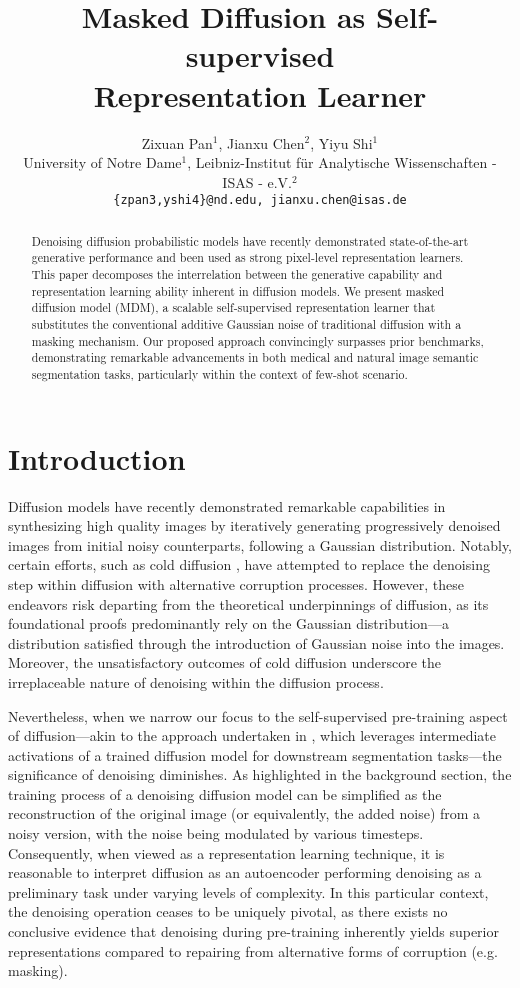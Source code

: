 \documentclass{article} \usepackage{iclr2024_conference,times}
\title{Masked Diffusion as Self-supervised \\ Representation Learner}
\author{Zixuan Pan$^1$, Jianxu Chen$^2$, Yiyu Shi$^1$\\
University of Notre Dame$^1$, Leibniz-Institut für Analytische Wissenschaften - ISAS - e.V.$^2$\\
\texttt{\{zpan3,yshi4\}@nd.edu, jianxu.chen@isas.de} \\
}
\begin{document}
\maketitle

\begin{abstract}
Denoising diffusion probabilistic models have recently demonstrated state-of-the-art generative performance and been used as strong pixel-level representation learners. This paper decomposes the interrelation between the generative capability and representation learning ability inherent in diffusion models. We present masked diffusion model (MDM), a scalable self-supervised representation learner that substitutes the conventional additive Gaussian noise of traditional diffusion with a masking mechanism. Our proposed approach convincingly surpasses prior benchmarks, demonstrating remarkable advancements in both medical and natural image semantic segmentation tasks, particularly within the context of few-shot scenario.
\end{abstract}

\section{Introduction}


Diffusion models \citep{DBLP:conf/icml/Sohl-DicksteinW15,DBLP:conf/nips/HoJA20} have recently demonstrated remarkable capabilities in synthesizing high quality images by iteratively generating progressively denoised images from initial noisy counterparts, following a Gaussian distribution.  Notably, certain efforts, such as cold diffusion \citep{bansal2022cold}, have attempted to replace the denoising step within diffusion with alternative corruption processes. However, these endeavors risk departing from the theoretical underpinnings of diffusion, as its foundational proofs predominantly rely on the Gaussian distribution—a distribution satisfied through the introduction of Gaussian noise into the images. Moreover, the unsatisfactory outcomes of cold diffusion underscore the irreplaceable nature of denoising within the diffusion process.

Nevertheless, when we narrow our focus to the self-supervised pre-training aspect of diffusion—akin to the approach undertaken in \citet{DBLP:conf/iclr/BaranchukVRKB22}, which leverages intermediate activations of a trained diffusion model for downstream segmentation tasks—the significance of denoising diminishes. 
As highlighted in the background section, the training process of a denoising diffusion model can be simplified as the reconstruction of the original image (or equivalently, the added noise) from a noisy version, with the noise being modulated by various timesteps. Consequently, when viewed as a representation learning technique, it is reasonable to interpret diffusion as an autoencoder performing denoising as a preliminary task under varying levels of complexity.
In this particular context, the denoising operation ceases to be uniquely pivotal, as there exists no conclusive evidence that denoising during pre-training inherently yields superior representations compared to repairing from alternative forms of corruption (e.g. masking).
\end{document}
